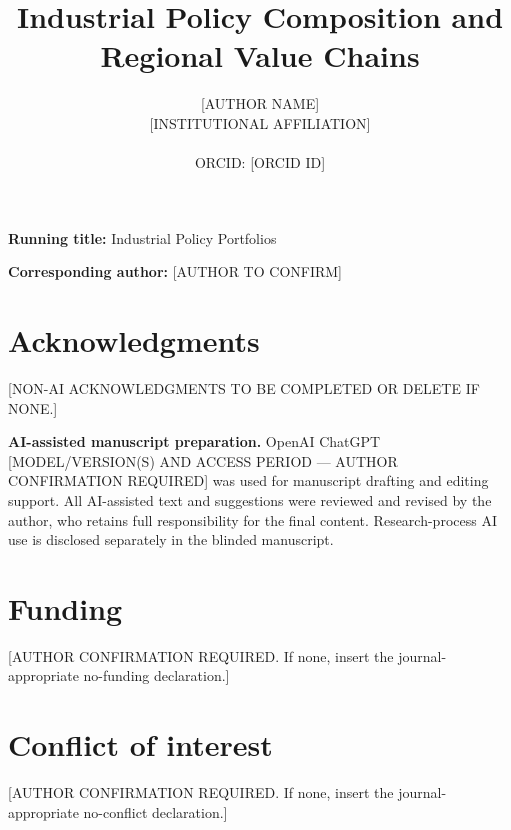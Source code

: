 \documentclass[11pt]{article}
\title{Industrial Policy Composition and Regional Value Chains}
\author{[AUTHOR NAME]\\[0.5em]
[INSTITUTIONAL AFFILIATION]\\
[EMAIL ADDRESS]\\
ORCID: [ORCID ID]}
\date{}
\begin{document}
\maketitle

\noindent\textbf{Running title:} Industrial Policy Portfolios

\noindent\textbf{Corresponding author:} [AUTHOR TO CONFIRM]

\section*{Acknowledgments}
[NON-AI ACKNOWLEDGMENTS TO BE COMPLETED OR DELETE IF NONE.]

\medskip
\noindent\textbf{AI-assisted manuscript preparation.}
OpenAI ChatGPT [MODEL/VERSION(S) AND ACCESS PERIOD --- AUTHOR CONFIRMATION REQUIRED] was used for manuscript drafting and editing support. All AI-assisted text and suggestions were reviewed and revised by the author, who retains full responsibility for the final content. Research-process AI use is disclosed separately in the blinded manuscript.

\section*{Funding}
[AUTHOR CONFIRMATION REQUIRED. If none, insert the journal-appropriate no-funding declaration.]

\section*{Conflict of interest}
[AUTHOR CONFIRMATION REQUIRED. If none, insert the journal-appropriate no-conflict declaration.]
\end{document}
